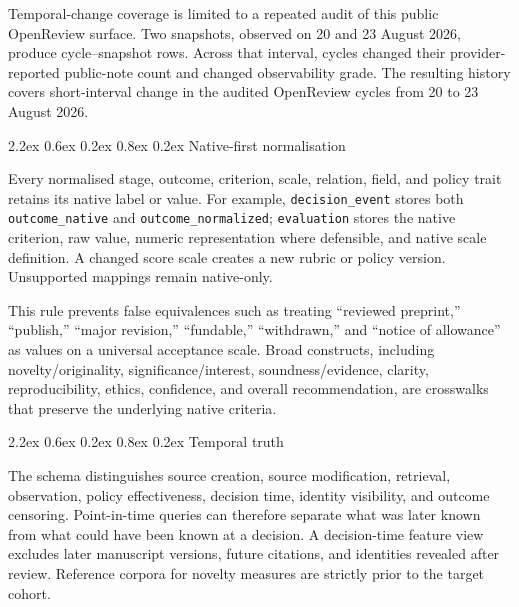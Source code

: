 \documentclass[
  10pt,
]{article}
\makeatletter
\renewcommand\subsection{\@startsection{subsection}{2}{\z@}%
  {2.2ex \@plus 0.6ex \@minus 0.2ex}%
  {0.8ex \@plus 0.2ex}%
  {\normalfont\large\sffamily\bfseries\color{OSGInk}}}
\makeatother
\begin{document}
Temporal-change coverage is limited to a repeated audit of this public
OpenReview surface. Two snapshots, observed on 20 and 23 August 2026,
produce \OSGClaimPublicObservabilitySnapshotRows{} cycle--snapshot rows.
Across that interval, \OSGClaimObservabilityRecordedCountChanges{} cycles
changed their provider-reported public-note count and
\OSGClaimObservabilityRecordedGradeChanges{} changed observability grade.
The resulting history covers short-interval change in the audited
OpenReview cycles from 20 to 23 August 2026.

\subsection{Native-first
normalisation}\label{23-native-first-normalization}

Every normalised stage, outcome, criterion, scale, relation, field, and
policy trait retains its native label or value. For example,
\texttt{decision\_event} stores both \texttt{outcome\_native} and
\texttt{outcome\_normalized}; \texttt{evaluation} stores the native
criterion, raw value, numeric representation where defensible, and
native scale definition. A changed score scale creates a new rubric or
policy version. Unsupported mappings remain native-only.

This rule prevents false equivalences such as treating ``reviewed
preprint,'' ``publish,'' ``major revision,'' ``fundable,''
``withdrawn,'' and ``notice of allowance'' as values on a universal
acceptance scale. Broad constructs, including novelty/originality,
significance/interest, soundness/evidence, clarity, reproducibility,
ethics, confidence, and overall recommendation, are crosswalks that
preserve the underlying native criteria.

\subsection{Temporal truth}\label{24-temporal-truth}

The schema distinguishes source creation, source modification,
retrieval, observation, policy effectiveness, decision time, identity
visibility, and outcome censoring. Point-in-time queries can therefore
separate what was later known from what could have been known at a
decision. A decision-time feature view excludes later manuscript
versions, future citations, and identities revealed after review.
Reference corpora for novelty measures are strictly prior to the target
cohort.
\end{document}
